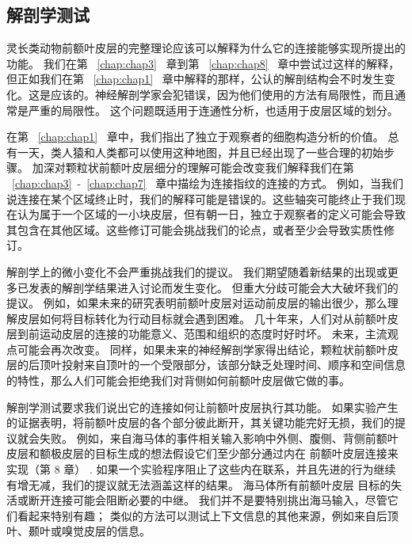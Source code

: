 \subsection{解剖学测试}
灵长类动物前额叶皮层的完整理论应该可以解释为什么它的连接能够实现所提出的功能。 我们在第 ~\ref{chap:chap3}~ 章到第 ~\ref{chap:chap8}~ 章中尝试过这样的解释，但正如我们在第 ~\ref{chap:chap1}~ 章中解释的那样，公认的解剖结构会不时发生变化。这是应该的。神经解剖学家会犯错误，因为他们使用的方法有局限性，而且通常是严重的局限性。 这个问题既适用于连通性分析，也适用于皮层区域的划分。
\par 
在第 ~\ref{chap:chap1}~ 章中，我们指出了独立于观察者的细胞构造分析的价值。 总有一天，类人猿和人类都可以使用这种地图，并且已经出现了一些合理的初始步骤。 加深对颗粒状前额叶皮层细分的理解可能会改变我们解释我们在第 ~\ref{chap:chap3}~-~\ref{chap:chap7}~ 章中描绘为连接指纹的连接的方式。 例如，当我们说连接在某个区域终止时，我们的解释可能是错误的。这些轴突可能终止于我们现在认为属于一个区域的一小块皮层，但有朝一日，独立于观察者的定义可能会导致其包含在其他区域。这些修订可能会挑战我们的论点，或者至少会导致实质性修订。
\par 
解剖学上的微小变化不会严重挑战我们的提议。 我们期望随着新结果的出现或更多已发表的解剖学结果进入讨论而发生变化。 但重大分歧可能会大大破坏我们的提议。 例如，如果未来的研究表明前额叶皮层对运动前皮层的输出很少，那么理解皮层如何将目标转化为行动目标就会遇到困难。 几十年来，人们对从前额叶皮层到前运动皮层的连接的功能意义、范围和组织的态度时好时坏。 未来，主流观点可能会再次改变。 同样，如果未来的神经解剖学家得出结论，颗粒状前额叶皮层的后顶叶投射来自顶叶的一个受限部分，该部分缺乏处理时间、顺序和空间信息的特性，那么人们可能会拒绝我们对背侧如何前额叶皮层做它做的事。
\par 
解剖学测试要求我们说出它的连接如何让前额叶皮层执行其功能。 如果实验产生的证据表明，将前额叶皮层的各个部分彼此断开，其关键功能完好无损，我们的提议就会失败。 例如，来自海马体的事件相关输入影响中外侧、腹侧、背侧前额叶皮层和额极皮层的目标生成的想法假设它们至少部分通过内在 前额叶皮层连接来实现（第 8 章） . 如果一个实验程序阻止了这些内在联系，并且先进的行为继续有增无减，我们的提议就无法涵盖这样的结果。 海马体所有前额叶皮层 目标的失活或断开连接可能会阻断必要的中继。 我们并不是要特别挑出海马输入，尽管它们看起来特别有趣； 类似的方法可以测试上下文信息的其他来源，例如来自后顶叶、颞叶或嗅觉皮层的信息。
